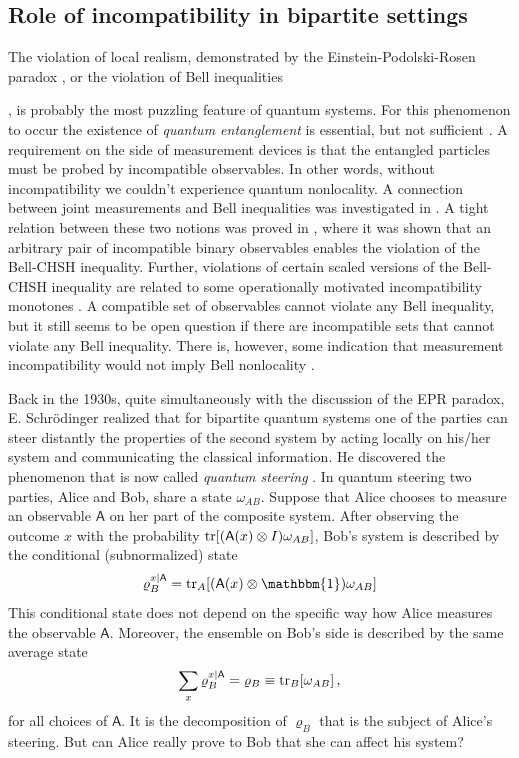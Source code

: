 \documentclass[12pt]{article}
\theoremstyle{definition}
\newcommand{\id}{\mathbbm{1}} %
\newcommand{\Ao}{\mathsf{A}}%
\begin{document}
\subsection{Role of incompatibility in bipartite settings}

The violation of local realism, demonstrated by the Einstein-Podolski-Rosen paradox \cite{EiPoRo35}, or the violation of Bell inequalities {\cite{Bell64}, is probably the most puzzling feature of quantum systems.
For this phenomenon to occur the existence of \emph{quantum entanglement} 
is essential, but not sufficient \cite{Werner89}. 
A requirement on the side of measurement devices is that the entangled 
particles must be probed by incompatible observables. 
In other words, without incompatibility we couldn't experience quantum nonlocality. 
A connection between joint measurements and Bell inequalities was investigated in \cite{SoAnBaKi05}. 
A tight relation between these two notions was proved in \cite{WoPeFe09}, where it was shown that an arbitrary pair of incompatible binary observables enables the violation of the Bell-CHSH inequality.
Further, violations of certain scaled versions of the Bell-CHSH inequality are related to some operationally motivated incompatibility monotones \cite{HeKiRe15}.
A compatible set of observables cannot violate any Bell inequality, but it still seems to be open question if there are incompatible sets that cannot violate any Bell inequality.
There is, however, some indication that measurement incompatibility would not imply Bell nonlocality \cite{QuBoHiBr15}.

Back in the 1930s, quite simultaneously with the discussion of the EPR paradox, 
E. Schr\"odinger realized \cite{Schrodinger35} that for bipartite quantum 
systems one of the parties can steer distantly the properties of the second
system by acting locally on his/her system and communicating
the classical information. 
He discovered the phenomenon that is now called \emph{quantum 
steering} \cite{WiJoDo07}. 
In quantum steering two parties, Alice and Bob, share a state $\omega_{AB}$. 
Suppose that Alice chooses to measure an observable $\Ao$ on her part of the composite system. 
After observing the outcome $x$ with the probability ${\rm tr}[(\Ao(x)\otimes I)\omega_{AB}]$, 
Bob's system is described by the conditional (subnormalized)
state 
\begin{equation}
\varrho_{B}^{x|\Ao}={\rm tr}_A [(\Ao(x)\otimes \id)\omega_{AB}]
\end{equation}
This conditional state does not depend on the specific way how Alice measures the observable $\Ao$.
Moreover, the ensemble on Bob's side is described by the same average state
\begin{equation}
\sum_x \varrho_B^{x|\Ao}=\varrho_B\equiv{\rm tr}_B[\omega_{AB}] \, , 
\end{equation}
for all choices of $\Ao$.
It is the decomposition of $\varrho_B$ that is the subject of Alice's 
steering. 
But can Alice really prove to Bob that she can affect his system?

}
\end{document}
